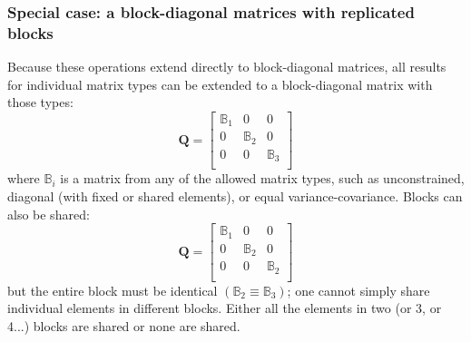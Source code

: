 \documentclass[]{article}
\def\QQ{\mbox{$\mathbf Q$}}	 \def\qq{\mbox{$\mathbf q$}} \def\Qb{\mbox{$\mathbf G$}}  \def\Qm{\mathbb{Q}}
\begin{document}
\subsubsection{Special case: a block-diagonal matrices with replicated blocks}
\label{sec:Q.block.diagonal}
Because these operations extend directly to block-diagonal matrices, all results for individual matrix types can be extended to a block-diagonal matrix with those types:
\begin{equation*}
\QQ=
\begin{bmatrix}
\mathbb{B}_1&0&0\\
0&\mathbb{B}_2&0\\
0&0&\mathbb{B}_3\\
\end{bmatrix}
\end{equation*}
where $\mathbb{B}_i$ is a matrix from any of the allowed matrix types, such as unconstrained, diagonal (with fixed or shared elements), or equal variance-covariance.   Blocks can also be shared:
\begin{equation*}\QQ=
\begin{bmatrix}
\mathbb{B}_1&0&0\\
0&\mathbb{B}_2&0\\
0&0&\mathbb{B}_2\\
\end{bmatrix}
\end{equation*}
but the entire block must be identical $(\mathbb{B}_2 \equiv \mathbb{B}_3)$; one cannot simply share individual elements in different blocks.  Either all the elements in two (or 3, or 4...) blocks are shared or none are shared. 
\end{document}
